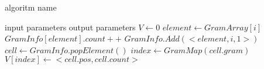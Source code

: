 \documentclass{article}
\begin{document}
	\renewcommand{\algorithmicrequire}{ \textbf{Input:}}
	\renewcommand{\algorithmicensure}{ \textbf{Output:}}
	\begin{algorithm}
	    \caption{algoritm name}
	    \begin{algorithmic}[1]
	        \Require input parameters
	        \Ensure output parameters
	            \State $V \gets 0$
	                \State $element \gets GramArray[i]$
	                    \State $GramInfo[element].count++$
	                \Else
	                    \State $GramInfo.Add(<element,i,1>)$
	                \EndIf
	            \EndFor
	                \State $cell \gets GramInfo.popElement()$
	                \State $index \gets GramMap(cell.gram)$
	                \State $V[index] \gets <cell.pos,cell.count>$
	            \EndWhile
	            \State {}
	        \EndFunction
	    \end{algorithmic}
	\end{algorithm}
\end{document}
